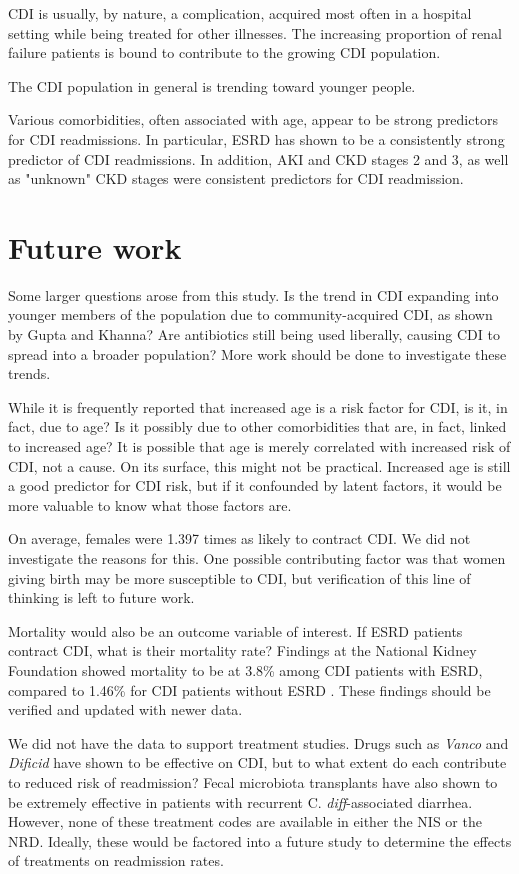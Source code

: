 \documentclass[12pt]{ociamthesis}\usepackage[]{graphicx}\usepackage[]{color}
\newcommand{\cdiff}{C. \textit{diff}}
\begin{document}
CDI is usually, by nature, a complication, acquired most often in a hospital
setting while being treated for other illnesses. The increasing proportion of 
renal failure patients is bound to contribute to the growing CDI population.

The CDI population in general is trending toward younger people.

Various comorbidities, often associated with age, appear to be strong predictors
for CDI readmissions. In particular, ESRD has shown to be a consistently strong
predictor of CDI readmissions. In addition, AKI and CKD stages 2 and 3, as well as "unknown" CKD
stages were consistent predictors for CDI readmission. 


\section{Future work}

Some larger questions arose from this study. 
Is the trend in CDI expanding into younger members of the population due
to community-acquired CDI, as shown by Gupta and Khanna? \cite{Gupta2014} Are antibiotics
still being used liberally, causing CDI to spread into a broader population? More 
work should be done to investigate these trends.

While it is frequently reported that increased age is a risk factor for CDI, is it, in fact, 
due to age? Is it possibly due to other comorbidities that are, in fact, linked to increased age?
It is possible that age is merely correlated with increased risk of CDI, not a cause.
On its surface, this might not be practical. Increased age is still a good predictor for CDI risk, 
but if it confounded by latent factors, it would be more valuable to know what those factors are. 

On average, females were 1.397 
times as likely to contract CDI. We did not investigate the
reasons for this. One possible contributing factor was that women giving birth may be more susceptible to CDI, but 
verification of this line of thinking is left to future work.

Mortality would also be an outcome variable of interest. If ESRD patients contract CDI, what is their mortality rate?
Findings at the National Kidney Foundation showed mortality to be at 3.8\% among CDI patients with ESRD, compared to
1.46\% for CDI patients without ESRD \cite{Susman2013}. These findings should be verified and updated with newer data. 

We did not have the data to support treatment studies. Drugs such as \textit{Vanco} and \textit{Dificid} have shown to
be effective on CDI, but to what extent do each contribute to reduced risk of readmission? Fecal microbiota transplants
have also shown to be extremely effective in patients with recurrent \cdiff-associated diarrhea. However, none of these
treatment codes are available in either the NIS or the NRD. Ideally, these would be factored into a future study to
determine the effects of treatments on readmission rates. 
\end{document}
